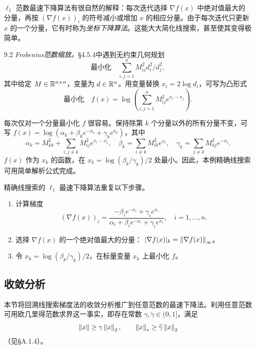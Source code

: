$\ell_1$ 范数最速下降算法有很自然的解释：每次迭代选择 $\nabla f(x)$ 中绝对值最大的分量，再按 $(\nabla f(x))_i$ 的符号减小或增加 $x$ 的相应分量。由于每次迭代只更新 $x$ 的一个分量，它有时称为\emph{坐标下降算法}。这能大大简化线搜索，甚至使其变得极简单。

\begin{origexample}{9.2}
\emph{Frobenius范数缩放。}§4.5.4中遇到无约束几何规划
\[
\text{最小化}\quad\sum_{i,j=1}^n M_{ij}^2d_i^2/d_j^2,
\]
其中给定 $M\in\mathbb R^{n\times n}$，变量为 $d\in\mathbb R^n$。用变量替换 $x_i=2\log d_i$，可写为凸形式
\[
\text{最小化}\quad
f(x)=\log\left(\sum_{i,j=1}^n M_{ij}^2e^{x_i-x_j}\right).
\]

每次仅对一个分量最小化 $f$ 很容易。保持除第 $k$ 个分量以外的所有分量不变，可写
$f(x)=\log(\alpha_k+\beta_ke^{-x_k}+\gamma_ke^{x_k})$，其中
\[
\alpha_k=M_{kk}^2+\sum_{i,j\ne k}M_{ij}^2e^{x_i-x_j},\quad
\beta_k=\sum_{i\ne k}M_{ik}^2e^{x_i},\quad
\gamma_k=\sum_{j\ne k}M_{kj}^2e^{-x_j}.
\]
$f(x)$ 作为 $x_k$ 的函数，在 $x_k=\log(\beta_k/\gamma_k)/2$ 处最小。因此，本例精确线搜索可用简单解析公式完成。

精确线搜索的 $\ell_1$ 最速下降算法重复以下步骤。
\begin{enumerate}
\item 计算梯度
\[
(\nabla f(x))_i=
\frac{-\beta_ie^{-x_i}+\gamma_ie^{x_i}}
{\alpha_i+\beta_ie^{-x_i}+\gamma_ie^{x_i}},\quad i=1,\ldots,n.
\]
\item 选择 $\nabla f(x)$ 的一个绝对值最大的分量：
$|\nabla f(x)|_k=\left\lVert \nabla f(x)\right\rVert_\infty$。
\item 令 $x_k=\log(\beta_k/\gamma_k)/2$，在标量变量 $x_k$ 上最小化 $f$。
\end{enumerate}
\end{origexample}

\subsection{收敛分析}
本节将回溯线搜索梯度法的收敛分析推广到任意范数的最速下降法。利用任意范数可用欧几里得范数求界这一事实，即存在常数 $\gamma,\widetilde\gamma\in(0,1]$，满足
\[
\left\lVert x\right\rVert\ge\gamma\left\lVert x\right\rVert_2,\qquad
\left\lVert x\right\rVert_*\ge\widetilde\gamma\left\lVert x\right\rVert_2
\]
（见§A.1.4）。

